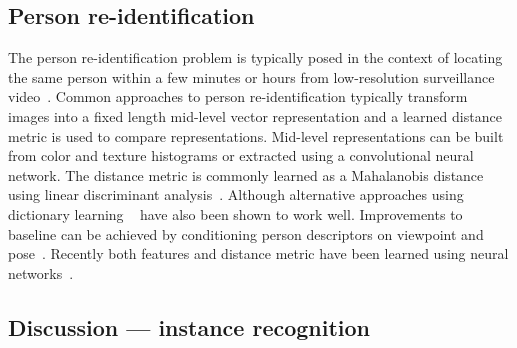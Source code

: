     \subsection{Person re-identification}
        The person re-identification problem is typically posed in the context of locating the same person within a few
        minutes or hours from low-resolution surveillance
        video~\cite{hirzer_relaxed_2012,karanam_person_2015,wu_viewpoint_2015,shi_embedding_2016}. Common approaches to
        person re-identification typically transform images into a fixed length mid-level vector representation and a
        learned distance metric is used to compare representations. Mid-level representations can be built from color
        and texture histograms or extracted using a convolutional neural network. The distance metric is commonly
        learned as a Mahalanobis distance using linear discriminant analysis~\cite{hirzer_relaxed_2012}. Although
        alternative approaches using dictionary learning ~\cite{karanam_person_2015} have also been shown to work well.
        Improvements to baseline can be achieved by conditioning person descriptors on viewpoint and
        pose~\cite{wu_viewpoint_2015}. Recently both features and distance metric have been learned using neural
        networks~\cite{shi_embedding_2016}.

    \subsection{Discussion --- instance recognition}

